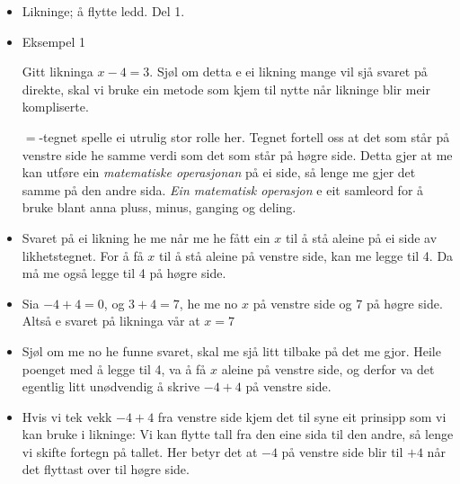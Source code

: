 


\begin{itemize}
	\item Likninge; å flytte ledd. Del 1.

	\item Eksempel 1
	
	Gitt likninga $ x-4=3 $. Sjøl om detta e ei likning mange vil sjå svaret på direkte, skal vi bruke ein metode som kjem til nytte når likninge blir meir kompliserte.
	
	$ = $-tegnet spelle ei utrulig stor rolle her. Tegnet fortell oss at det som står på venstre side he samme verdi som det som står på høgre side. Detta gjer at me kan utføre ein \textit{matematiske operasjonan} på ei side, så lenge me gjer det samme på den andre sida. \textit{Ein matematisk operasjon} e eit samleord for å bruke blant anna pluss, minus, ganging og deling.
	\item Svaret på ei likning he me når me he fått ein $ x $ til å stå aleine på ei side av likhetstegnet. For å få $ x $ til å stå aleine på venstre side, kan me legge til 4. Da må me også legge til 4 på høgre side.
	\item Sia $ -4+4=0 $, og $ 3+4 = 7 $, he me no $ x $ på venstre side og $ 7 $ på høgre side. Altså e svaret på likninga vår at $ x=7 $
	\item Sjøl om me no he funne svaret, skal me sjå litt tilbake på det me gjor. Heile poenget med å legge til 4, va å få $ x $ aleine på venstre side, og derfor va det egentlig litt unødvendig å skrive $ -4+4 $ på venstre side.
	\item Hvis vi tek vekk $ -4+4 $ fra venstre side kjem det til syne eit prinsipp som vi kan bruke i likninge: Vi kan flytte tall fra den eine sida til den andre, så lenge vi skifte fortegn på tallet. Her betyr det at $ -4 $ på venstre side blir til $ +4 $ når det flyttast over til høgre side.
\end{itemize}

